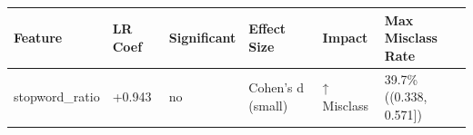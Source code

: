 \begin{tabular}{llllll}
\toprule
Feature & LR Coef & Significant & Effect Size & Impact & Max Misclass Rate \\
\midrule
stopword\_ratio & +0.943 & no & Cohen's d (small) & ↑ Misclass & 39.7\% ((0.338, 0.571]) \\
\bottomrule
\end{tabular}
